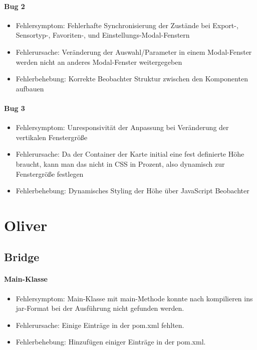 \paragraph{Bug 2}
\begin{itemize}
	\item Fehlersymptom: Fehlerhafte Synchronisierung der Zustände bei Export-, Sensortyp-, Favoriten-, und Einstellungs-Modal-Fenstern
	\item Fehlerursache: Veränderung der Auswahl/Parameter in einem Modal-Fenster werden nicht an anderes Modal-Fenster weitergegeben
	\item Fehlerbehebung: Korrekte Beobachter Struktur zwischen den Komponenten aufbauen
\end{itemize}

\paragraph{Bug 3}
\begin{itemize}
	\item Fehlersymptom: Unresponsivität der Anpassung bei Veränderung der vertikalen Fenstergröße
	\item Fehlerursache: Da der Container der Karte initial eine fest definierte Höhe braucht, kann man das nicht in CSS in Prozent, also dynamisch zur Fenstergröße festlegen
	\item Fehlerbehebung: Dynamisches Styling der Höhe über JavaScript Beobachter
\end{itemize}

\newpage
\section{Oliver}
\subsection{Bridge}
\paragraph{Main-Klasse}
\begin{itemize}
	\item Fehlersymptom: Main-Klasse mit main-Methode konnte nach kompilieren ins jar-Format bei der Ausführung nicht gefunden werden.
	\item Fehlerursache: Einige Einträge in der pom.xml fehlten.
	\item Fehlerbehebung: Hinzufügen einiger Einträge in der pom.xml.
\end{itemize}

